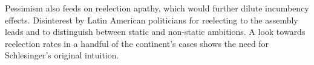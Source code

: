 \documentclass[letter,12pt]{article}
\newcommand{\mc}{\multicolumn}
\begin{document}
Pessimism also feeds on reelection apathy, which would further dilute incumbency effects. Disinterest by Latin American politicians for reelecting to the assembly leads \citet{morgenstern.2002b} and \citet{micozziPhD2009} to distinguish between static and non-static ambitions. A look towards reelection rates in a handful of the continent's cases shows the need for Schlesinger's \citeyearpar{schlesinger.1966} original intuition.

\end{document}
